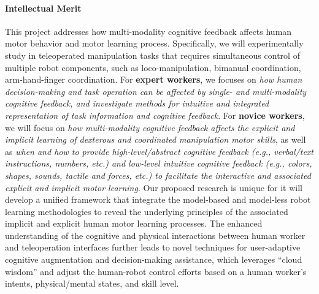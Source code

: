 \paragraph*{\Large Intellectual Merit}
This project addresses how multi-modality cognitive feedback affects human motor behavior and motor learning process. Specifically, we will experimentally study in teleoperated manipulation tasks that requires simultaneous control of multiple robot components, such as loco-manipulation, bimanual coordination, arm-hand-finger coordination. For \textbf{expert workers}, we focuses on \textit{how human decision-making and task operation can be affected by single- and multi-modality cognitive feedback, and investigate methods for intuitive and integrated representation of task information and cognitive feedback}. For \textbf{novice workers}, we will focus on \textit{how multi-modality cognitive feedback affects the explicit and implicit learning of dexterous and coordinated manipulation motor skills}, as well as \textit{when and how to provide high-level/abstract cognitive feedback (e.g., verbal/text instructions, numbers, etc.) and low-level intuitive cognitive feedback (e.g., colors, shapes, sounds, tactile and forces, etc.) to facilitate the interactive and associated explicit and implicit motor learning}. Our proposed research is unique for it will develop a unified framework that integrate the model-based and model-less robot learning methodologies to reveal the underlying principles of the associated implicit and explicit human motor learning processes. The enhanced understanding of the cognitive and physical interactions between human worker and teleoperation interfaces further leads to novel techniques for user-adaptive cognitive augmentation and decision-making assistance, which leverages ``cloud wisdom'' and adjust the human-robot control efforts based on a human worker's intents, physical/mental states, and skill level. 




